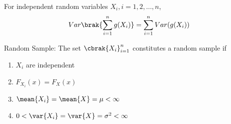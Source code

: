 \begin{lemma}
For independent random variables $X_{i}, i = 1,2,\dots,n$, 
   \begin{align}
    Var\brak{\sum_{i=1}^{n}g(X_{i})}=\sum_{i=1}^{n}Var(g(X_{i}))\label{conv/4/basic}
    \end{align}
\end{lemma}
    \begin{definition}\label{conv/4/definition_of_Random_sample}
     Random Sample: The set $\cbrak{X_{i}}_{i=1}^{n}$ constitutes a random sample if
   \begin{enumerate}
       \item  $X_{i}$ are independent \label{conv/4/point 1}
       \item $F_{X_{i}}(x)=F_X(x)$ \label{conv/4/point 2}
       \item $\mean{X_i}=\mean{X}=\mu<\infty$ \label{conv/4/point 3}
       \item$ 0 < \var{X_i}=\var{X}=\sigma^2<\infty$ \label{conv/4/point 4}
   \end{enumerate}
    \end{definition}
 
